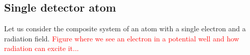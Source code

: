 \subsection{Single detector atom}

Let us consider the composite system of an atom with a single electron and a radiation field.
\textcolor{red}{Figure where we see an electron in a potential well and how radiation can excite it...}

